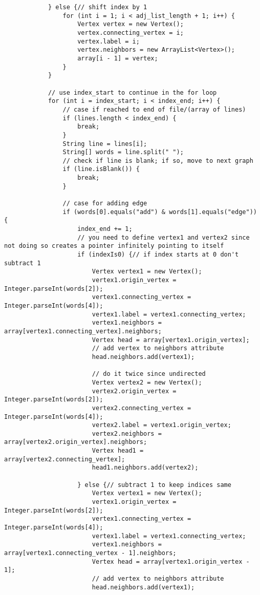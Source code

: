 \documentclass{article}
\begin{document}
\begin{lstlisting}
            } else {// shift index by 1
                for (int i = 1; i < adj_list_length + 1; i++) {
                    Vertex vertex = new Vertex();
                    vertex.connecting_vertex = i;
                    vertex.label = i;
                    vertex.neighbors = new ArrayList<Vertex>();
                    array[i - 1] = vertex;
                }
            }

            // use index_start to continue in the for loop
            for (int i = index_start; i < index_end; i++) {
                // case if reached to end of file/(array of lines)
                if (lines.length < index_end) {
                    break;
                }
                String line = lines[i];
                String[] words = line.split(" ");
                // check if line is blank; if so, move to next graph
                if (line.isBlank()) {
                    break;
                }

                // case for adding edge
                if (words[0].equals("add") & words[1].equals("edge")) {
                    index_end += 1;
                    // you need to define vertex1 and vertex2 since not doing so creates a pointer infinitely pointing to itself
                    if (indexIs0) {// if index starts at 0 don't subtract 1
                        Vertex vertex1 = new Vertex();
                        vertex1.origin_vertex = Integer.parseInt(words[2]);
                        vertex1.connecting_vertex = Integer.parseInt(words[4]);
                        vertex1.label = vertex1.connecting_vertex;
                        vertex1.neighbors = array[vertex1.connecting_vertex].neighbors;
                        Vertex head = array[vertex1.origin_vertex];
                        // add vertex to neighbors attribute
                        head.neighbors.add(vertex1);

                        // do it twice since undirected
                        Vertex vertex2 = new Vertex();
                        vertex2.origin_vertex = Integer.parseInt(words[2]);
                        vertex2.connecting_vertex = Integer.parseInt(words[4]);
                        vertex2.label = vertex1.origin_vertex;
                        vertex2.neighbors = array[vertex2.origin_vertex].neighbors;
                        Vertex head1 = array[vertex2.connecting_vertex];
                        head1.neighbors.add(vertex2);

                    } else {// subtract 1 to keep indices same
                        Vertex vertex1 = new Vertex();
                        vertex1.origin_vertex = Integer.parseInt(words[2]);
                        vertex1.connecting_vertex = Integer.parseInt(words[4]);
                        vertex1.label = vertex1.connecting_vertex;
                        vertex1.neighbors = array[vertex1.connecting_vertex - 1].neighbors;
                        Vertex head = array[vertex1.origin_vertex - 1];
                        // add vertex to neighbors attribute
                        head.neighbors.add(vertex1);


\end{lstlisting}
\end{document}
